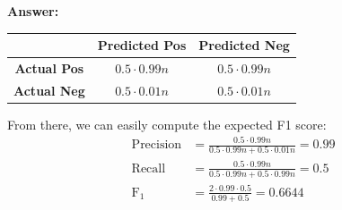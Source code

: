 \documentclass{article}
\newenvironment{QandA}{\begin{enumerate}[label=\arabic*.]}{\end{enumerate}}
\newenvironment{InnerQandA}{\begin{enumerate}[label=\roman*.]}{\end{enumerate}}
\newenvironment{answer}{\par\normalfont \textbf{Answer:}}{}
\begin{document}
\begin{QandA}
\begin{InnerQandA}
\begin{answer}
            \begin{table}[h!]
            \centering
            \begin{tabular}{|c|c|c|}
            \hline
                                  & \textbf{Predicted Pos} & \textbf{Predicted Neg} \\ \hline
            \textbf{Actual Pos}  & $0.5 \cdot 0.99n$                      & $0.5 \cdot 0.99n$                       \\ \hline
            \textbf{Actual Neg} & $0.5 \cdot 0.01n$                       & $0.5 \cdot 0.01n$                       \\ \hline
            \end{tabular}
            \end{table}
             From there, we can easily compute the expected F1 score:
             \begin{align*}
                 \text{Precision} &= \frac{0.5 \cdot 0.99n}{0.5 \cdot 0.99n + 0.5 \cdot 0.01n} = 0.99\\
                \text{Recall} &= \frac{0.5 \cdot 0.99n}{0.5 \cdot 0.99n + 0.5 \cdot 0.99n} = 0.5\\
                \text{F}_1 &=  \frac{2 \cdot 0.99 \cdot 0.5}{0.99 + 0.5} = 0.6644
             \end{align*}
         \end{answer}
    \end{InnerQandA}


\end{QandA}
\end{document}
